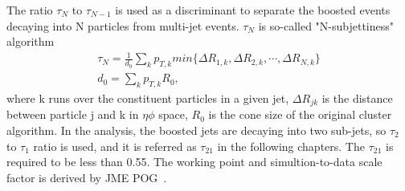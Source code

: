 The ratio $\tau _N $ to $\tau _{N-1}$ is used as a discriminant to separate the boosted events decaying into N particles from multi-jet events. $\tau _N $ is so-called "N-subjettiness" algorithm~\citep{Thaler:2010tr,Thaler:2011gf,Stewart:2010tn}
\begin{equation} \label{eq6}
\begin{split}
\tau _N = \frac{1}{d_0} \sum\limits_{k}  p_{T,k} min \{ \Delta R_{1,k},\Delta R_{2,k},\cdots,\Delta R_{N,k} \} \\
d_0 = \sum\limits_{k}  p_{T,k} R_0,
\end{split}
\end{equation}
where k runs over the constituent particles in a given jet, $\Delta R_{jk}$ is the distance between particle j and k in $\eta \phi$ space, $R_0$ is the cone size of the original cluster algorithm. In the analysis, the boosted jets are decaying into two sub-jets, so $\tau _2 $ to $\tau _1$ ratio is used, and it is referred as $\tau _{21}$ in the following chapters.
The $\tau _{21}$ is required to be less than 0.55.  
The working point and simultion-to-data scale factor is derived by JME POG~\citep{WTagTWikiWPs}.

